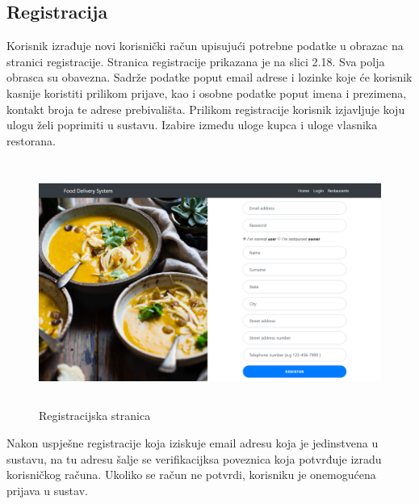 \documentclass[times, utf8, zavrsni, numeric]{fer}
\begin{document}
\subsection{Registracija}
Korisnik izrađuje novi korisnički račun upisujući potrebne podatke u obrazac na stranici registracije. Stranica registracije prikazana je na slici 2.18. Sva polja obrasca su obavezna. Sadrže podatke poput email adrese i lozinke koje će korisnik kasnije koristiti prilikom prijave, kao i osobne podatke poput imena i prezimena, kontakt broja te adrese prebivališta. Prilikom registracije korisnik izjavljuje koju ulogu želi poprimiti u sustavu. Izabire između uloge kupca i uloge vlasnika restorana.
\begin{figure}[htb]
\centering
\includegraphics[height=8.0cm]{registracija.png}
\caption{Registracijska stranica}
\label{fig:regis}
\end{figure}

Nakon uspješne registracije koja iziskuje email adresu koja je jedinstvena u sustavu, na tu adresu šalje se verifikacijksa poveznica koja potvrđuje izradu korisničkog računa. Ukoliko se račun ne potvrdi, korisniku je onemogućena prijava u sustav.
\end{document}
